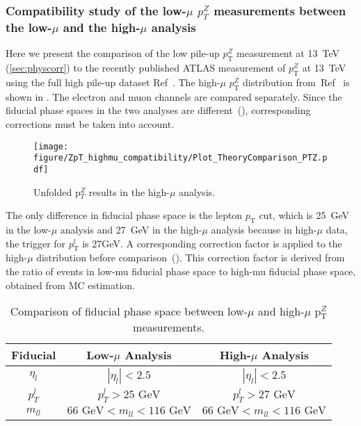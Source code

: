 \subsubsection{Compatibility study of the low-$\mu$ $p_{T}^{Z}$ measurements between the low-$\mu$ and the high-$\mu$ analysis}
\label{sssec:compatibilityHighmu}

Here we present the comparison of the low pile-up $p_{\mathrm{T}}^{Z}$ measurement at 13~TeV (\ref{sec:physcorr}) to the recently published ATLAS measurement of $p_{\mathrm{T}}^{Z}$ at 13~TeV using the full high pile-up dataset Ref~\cite{Aad:2019wmn}.
The high-$\mu$ $p_{\mathrm{T}}^{Z}$ distribution from~Ref~\cite{Aad:2019wmn}  is shown in \Fig{\ref{f:highmuZpT}}.
The electron and muon channels are compared separately. Since the fiducial phase spaces in the two analyses are different~(\Tab{\ref{tab:fiducial}}), corresponding corrections must be taken into account.

\begin{figure}[h]
\centering
\texttt{[image: figure/ZpT\_highmu\_compatibility/Plot\_TheoryComparison\_PTZ.pdf]}
\caption{Unfolded p$_{T}^{Z}$ results in the high-$\mu$ analysis.}
\label{f:highmuZpT}
\end{figure}

The only difference in fiducial phase space is the lepton $p_\mathrm{T}$ cut, which is 25~GeV in the low-$\mu$ analysis and 27~GeV in the high-$\mu$ analysis because in high-$\mu$ data, the trigger for $p_\mathrm{T}^l$ is 27GeV.
A corresponding correction factor is applied to the high-$\mu$ distribution before comparison~(\Fig{\ref{f:Correction}}). This correction factor is derived from the ratio of events in low-mu fiducial phase space to high-mu fiducial phase space, obtained from MC estimation.

\begin{table}[h]
\centering
\begin{tabular}{|c|c|c|}
\hline
Fiducial & Low-$\mu$ Analysis & High-$\mu$ Analysis \\
\hline
$\eta_l$  & $|\eta_{l}| < 2.5$ & $|\eta_{l}| < 2.5$ \\
\hline
$p_{T}^{l}$  & $p_{T}^{l}>25\textrm{ GeV}$ &  $p_{T}^{l}>27\textrm{ GeV}$ \\
\hline
$m_{ll}$ &  $66 \textrm{ GeV} < m_{ll} < 116 \textrm{ GeV}$ & $66 \textrm{ GeV} < m_{ll} <116 \textrm{ GeV}$ \\
\hline
\end{tabular}
\caption{Comparison of fiducial phase space between low-$\mu$ and high-$\mu$ p$_{\mathrm{T}}^{Z}$ measurements.}
\label{tab:fiducial}
\end{table}

